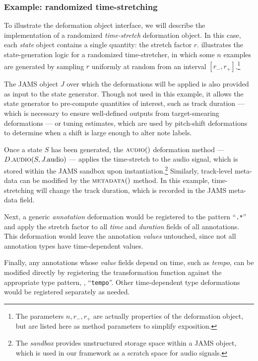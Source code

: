 \documentclass{article}
\begin{document}
\subsubsection{Example: randomized time-stretching}
To illustrate the deformation object interface, we will describe the implementation of a 
randomized \emph{time-stretch} deformation object.
In this case, each \emph{state} object contains a single quantity: the stretch factor $r$.
 illustrates the state-generation logic for a randomized
time-stretcher, in which some $n$ examples are generated by sampling $r$ uniformly at
random from an interval $[r_-, r_+]$.\footnote{The parameters $n, r_-, r_+$ are actually
    properties of the deformation object, but are listed here as method parameters to
simplify exposition.}

The JAMS object $J$ over which the deformations will be applied is also provided as input 
to the state generator.  Though not used in this example, it allows the state generator
to pre-compute quantities of interest, such as track duration 
 --- which is necessary to ensure well-defined outputs from target-smearing deformations --- 
or tuning estimates, which are used by pitch-shift deformations to 
determine when a shift is large enough to 
alter note labels.

Once a state $S$ has been generated, the $\Call{audio}$ deformation method
--- $D.\Call{audio}{S, J.\text{audio}}$ --- 
applies the time-stretch to the audio signal, which is stored within the
JAMS sandbox upon instantiation.\footnote{The \emph{sandbox} provides unstructured
storage space within a JAMS object, which is used in our framework as a scratch space for
audio signals.}  Similarly, track-level meta-data can be modified by the $\Call{metadata}$
method.  In this example, time-stretching will change the track duration, which is recorded
in the JAMS meta-data field.

Next, a generic \emph{annotation} deformation would be registered to the pattern
``\texttt{.*}'' and apply the stretch factor to all \emph{time} and \emph{duration}
fields of all annotations.  This deformation would leave the annotation
\emph{values} untouched, since not all annotation types have time-dependent values.

Finally, any annotations whose \emph{value} fields depend on time, such as \emph{tempo},
can be modified directly by registering the transformation function against the
appropriate type pattern, \eg, ``\texttt{tempo}''.  Other time-dependent type
deformations would be registered separately as needed.
\end{document}
